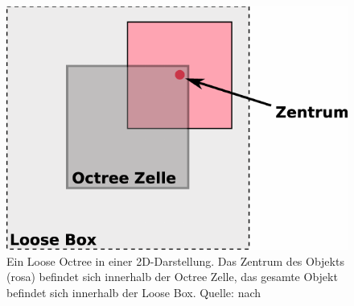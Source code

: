 \begin{figure}
 \centering
  \includegraphics[scale=0.8]{images/looseoctree2.pdf}
  \caption{Ein Loose Octree in einer 2D-Darstellung. Das Zentrum des Objekts (rosa) befindet sich innerhalb der Octree Zelle, das gesamte Objekt befindet sich innerhalb der Loose Box. Quelle: nach \cite{anteru}}
 \label{fig:basics:looseoctree}
\end{figure}

